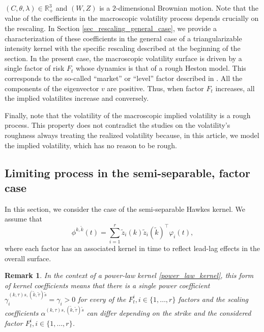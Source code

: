 \documentclass[12pt]{article}
\newtheorem{remark}[theorem2]{Remark}
\begin{document}
$(C,\theta,\lambda)\in \mathbb{R}^3_+$ and $(W,Z)$ is a $2$-dimensional Brownian motion. Note that the value of the coefficients in the macroscopic volatility process depends crucially on the rescaling. In Section \ref{sec_rescaling_general_case}, we provide a characterization of these coefficients in the general case of a triangularizable intensity kernel with the specific rescaling described at the beginning of the section. In the present case, the macroscopic volatility surface is driven by a single factor of risk $F_t$ whose dynamics is that of a rough Heston model. This corresponds to the so-called ``market'' or ``level'' factor described in \cite{cont2002dynamics}. All the components of the eigenvector $v$ are positive. Thus, when factor $F_t$ increases, all the implied volatilites increase and conversely. 

\medskip
Finally, note that the volatility of the macroscopic implied volatility is a rough process. This property does not contradict the studies on the volatility's roughness always treating the realized volatility because, in this article, we model the implied volatility, which has no reason to be rough.  


\subsection{Limiting process in the semi-separable, factor case}
In this section, we consider the case of the semi-separable Hawkes kernel. We assume that
\[
\phi^{k,\tilde k}(t) = \sum_{i=1}^{r} \tilde z_i(k) \tilde z_i(\tilde{k})^\top \varphi_i(t) ,
\]
where each factor has an associated kernel in time to reflect lead-lag effects in the overall surface. 
\begin{remark}
In the context of a power-law kernel \eqref{power_law_kernel}, this form of kernel coefficients means that there is a single power coefficient $\gamma_i^{(k,\tau)s,(\tilde{k},\tilde{\tau})\tilde{s}}=\gamma_i>0$ for every of the $F^i_t, i\in \{1,\dots,r\}$ factors and the scaling coefficients $\alpha^{(k,\tau)s,(\tilde{k},\tilde{\tau})\tilde{s}}$ can differ depending on the strike and the considered factor $F^i_t, i\in \{1,\dots,r\}$. 
\end{remark}
\end{document}
